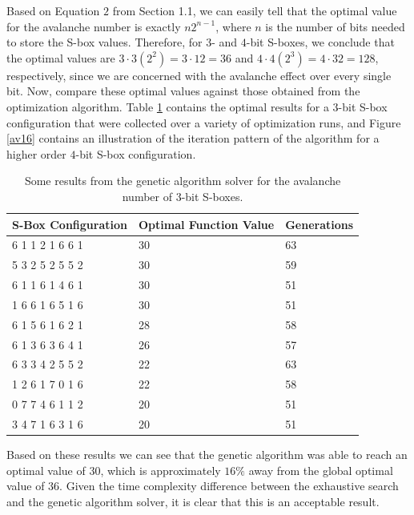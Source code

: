 \documentclass[11pt]{article}
\begin{document}

Based on Equation $2$ from Section 1.1, we can easily tell that the optimal value for the avalanche number is exactly $n2^{n-1}$, where $n$ is the number of bits needed to store the S-box values. Therefore, for $3$- and $4$-bit S-boxes, we conclude that the optimal values are $3 \cdot 3(2^2) = 3 \cdot 12 = 36$ and $4 \cdot 4(2^3) = 4 \cdot 32 = 128$, respectively, since we are concerned with the avalanche effect over every single bit. Now, compare these optimal values against those obtained from the optimization algorithm. Table \ref{avTable} contains the optimal results for a $3$-bit S-box configuration that were collected over a variety of optimization runs, and Figure \ref{av16} contains an illustration of the iteration pattern of the algorithm for a higher order $4$-bit S-box configuration.

\begin{table}
	\centering
	\label{avTable}
	\caption{Some results from the genetic algorithm solver for the avalanche number of $3$-bit S-boxes.}
    \begin{tabular}{|l|l|l|}
        \hline
        S-Box Configuration & Optimal Function Value & Generations \\ \hline
        6     1     1     2     1     6     6     1 & 30 & 63 \\
        5     3     2     5     2     5     5     2 & 30 & 59 \\ 
        6     1     1     6     1     4     6     1 & 30 & 51 \\ 
        1     6     6     1     6     5     1     6 & 30 & 51 \\ 
        6     1     5     6     1     6     2     1 & 28 & 58 \\ 
        6     1     3     6     3     6     4     1 & 26 & 57 \\ 
	6     3     3     4     2     5     5     2 & 22 & 63 \\ 
        1     2     6     1     7     0     1     6 & 22 & 58 \\ 
        0     7     7     4     6     1     1     2 & 20 & 51 \\ 
        3     4     7     1     6     3     1     6 & 20 & 51 \\ 
        \hline
    \end{tabular}
\end{table}

Based on these results we can see that the genetic algorithm was able to reach an optimal value of $30$, which is approximately $16\%$ away from the global optimal value of $36$. Given the time complexity difference between the exhaustive search and the genetic algorithm solver, it is clear that this is an acceptable result. 
\end{document}
